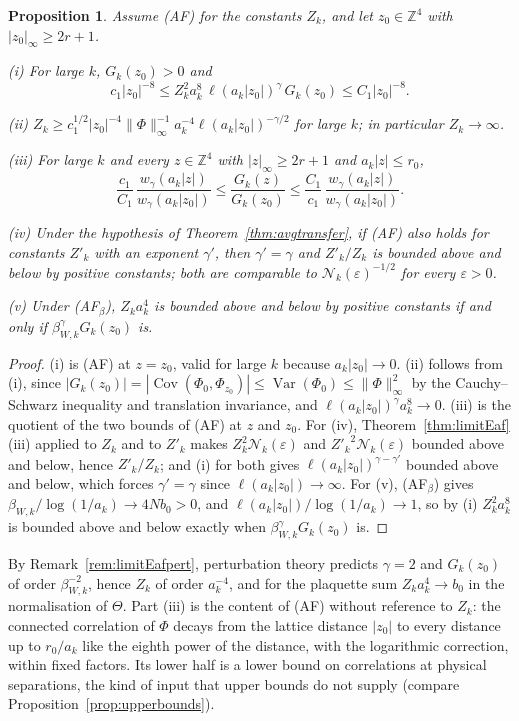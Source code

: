 \documentclass[aps,prd,twocolumn,superscriptaddress,nofootinbib,longbibliography,floatfix,amsmath,amssymb,10pt]{revtex4-2}
\newtheorem{proposition}[theorem]{Proposition}
\theoremstyle{definition}
\theoremstyle{remark}
\newcommand{\Z}{\mathbb{Z}}
\newcommand{\Cov}{\operatorname{Cov}}
\newcommand{\Var}{\operatorname{Var}}
\begin{document}
\begin{proposition}\label{prop:limitEafscale}
Assume \textup{(AF)} for the constants $Z_k$, and let $z_0\in\Z^4$ with
$|z_0|_\infty\ge2r+1$.

\textup{(i)} For large $k$, $G_k(z_0)>0$ and
\[
c_1|z_0|^{-8}\le Z_k^2a_k^8\,\ell(a_k|z_0|)^\gamma\,G_k(z_0)\le C_1|z_0|^{-8} .
\]

\textup{(ii)} $Z_k\ge c_1^{1/2}|z_0|^{-4}\|\Phi\|_\infty^{-1}a_k^{-4}\ell(a_k
|z_0|)^{-\gamma/2}$ for large $k$; in particular $Z_k\to\infty$.

\textup{(iii)} For large $k$ and every $z\in\Z^4$ with $|z|_\infty\ge2r+1$ and
$a_k|z|\le r_0$,
\[
\frac{c_1}{C_1}\,\frac{w_\gamma(a_k|z|)}{w_\gamma(a_k|z_0|)}\le\frac{G_k(z)}
{G_k(z_0)}\le\frac{C_1}{c_1}\,\frac{w_\gamma(a_k|z|)}{w_\gamma(a_k|z_0|)} .
\]

\textup{(iv)} Under the hypothesis of
Theorem~\textup{\ref{thm:avgtransfer}}, if \textup{(AF)} also holds for
constants $Z'_k$ with an exponent $\gamma'$, then $\gamma'=\gamma$ and
$Z'_k/Z_k$ is bounded above and below by positive constants; both are
comparable to $\mathcal N_k(\varepsilon)^{-1/2}$ for every $\varepsilon>0$.

\textup{(v)} Under \textup{(AF$_\beta$)}, $Z_ka_k^4$ is bounded above and
below by positive constants if and only if $\beta_{W,k}^\gamma G_k(z_0)$ is.
\end{proposition}

\begin{proof}
(i) is (AF) at $z=z_0$, valid for large $k$ because $a_k|z_0|\to0$. (ii)
follows from (i), since $|G_k(z_0)|=|\Cov(\Phi_0,\Phi_{z_0})|\le\Var(\Phi_0)
\le\|\Phi\|_\infty^2$ by the Cauchy--Schwarz inequality and translation
invariance, and $\ell(a_k|z_0|)^\gamma a_k^8\to0$. (iii) is the quotient
of the two bounds of (AF) at $z$ and $z_0$. For (iv), Theorem~\ref{thm:limitEaf}(iii)
applied to $Z_k$ and to $Z'_k$ makes $Z_k^2\mathcal N_k(\varepsilon)$ and
${Z'_k}^2\mathcal N_k(\varepsilon)$ bounded above and below, hence
$Z'_k/Z_k$; and (i) for both gives $\ell(a_k|z_0|)^{\gamma-\gamma'}$ bounded
above and below, which forces $\gamma'=\gamma$ since $\ell(a_k|z_0|)\to
\infty$. For (v), (AF$_\beta$) gives $\beta_{W,k}/\log(1/a_k)\to4Nb_0>0$,
and $\ell(a_k|z_0|)/\log(1/a_k)\to1$, so by (i) $Z_k^2a_k^8$ is bounded
above and below exactly when $\beta_{W,k}^\gamma G_k(z_0)$ is.
\end{proof}

By Remark~\ref{rem:limitEafpert}, perturbation theory predicts $\gamma=2$ and
$G_k(z_0)$ of order $\beta_{W,k}^{-2}$, hence $Z_k$ of order $a_k^{-4}$, and
for the plaquette sum $Z_ka_k^4\to b_0$ in the normalisation of $\Theta$.
Part (iii) is the content of (AF) without reference to $Z_k$: the connected
correlation of $\Phi$ decays from the lattice distance $|z_0|$ to every
distance up to $r_0/a_k$ like the eighth power of the distance, with the
logarithmic correction, within fixed factors. Its lower half is a lower
bound on correlations at physical separations, the kind of input that upper
bounds do not supply (compare Proposition~\ref{prop:upperbounds}).
\end{document}
